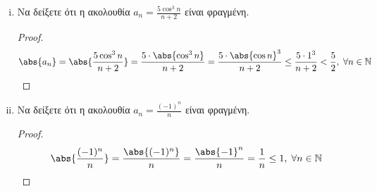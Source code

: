 \begin{enumerate}
\begin{enumerate}[i)]
                \begin{proof}
                    \begin{align*}
                        \abs{\frac{\cos{n} + n \sin{n}}{n^{2}}} = 
                        \frac{\abs{\cos{n} + n \sin{n}}}{n^{2}} \leq 
                        \frac{\abs{\cos{n}} + \abs{n \sin{n}}}{n^{2}} 
               &= \frac{\abs{\cos{n}} + n \abs{\sin{n}}}{n^{2}} \leq 
               \frac{1 + n\cdot 1}{n^{2}} = \\
               &= \frac{1}{n^{2}} + \frac{1}{n} \leq 
               1 + 1 = 2, \; \forall n \in \mathbb{N}
                    \end{align*} 
                \end{proof}

            \item Να δείξετε ότι η ακολουθία $ a_{n} = \frac{5 \cos^{3}{n}}{n+2} $ 
                είναι φραγμένη.

                \begin{proof}
                    \[
                        \abs{a_{n}} = \abs{\frac{5 \cos^{3}{n}}{n+2}} = 
                        \frac{5 \cdot \abs{\cos^{3}{n}}}{n+2} = \frac{5\cdot 
                        \abs{\cos{n}}^ {3}}{n+2} \leq  \frac{5 \cdot 1^{3}}{n+2} < 
                        \frac{5}{2}, \; \forall n \in \mathbb{N}
                    \]
                \end{proof}




            \item Να δείξετε ότι η ακολουθία $ a_{n} = \frac{(-1)^{n}}{n} $ είναι 
                φραγμένη.

                \begin{proof}
                    \[
                        \abs{\frac{(-1)^{n}}{n}} = \frac{\abs{(-1)^{n}}}{n} = 
                        \frac{\abs{-1}^{n}}{n} = \frac{1}{n} \leq 1, \; \forall n \in 
                        \mathbb{N} 
                    \] 
                \end{proof}


\end{enumerate}
\end{enumerate}

